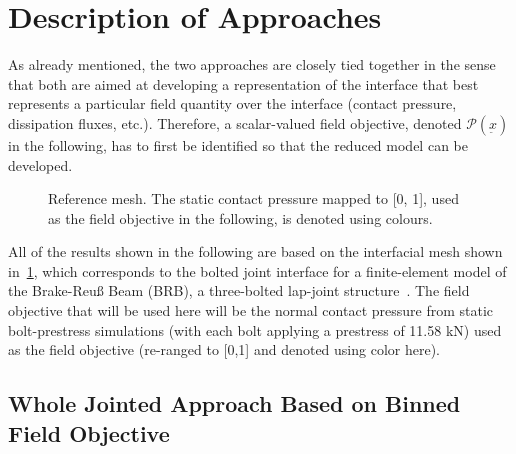 \documentclass[10pt,print]{article}
\newcommand{\utilde}[1]{\underset{\widetilde{}}{#1}}
\begin{document}
\section{Description of Approaches}
\label{sec:descr-appr}

As already mentioned, the two approaches are closely tied together in
the sense that both are aimed at developing a representation of the
interface that best represents a particular field quantity over the
interface (contact pressure, dissipation fluxes, etc.). Therefore, a
scalar-valued field objective, denoted $\mathcal{P}(\utilde{x})$
  in the following, has to first be identified so that the reduced
  model can be developed.

\begin{figure}[!h]
  \centering
  \caption{Reference mesh. The static contact pressure mapped to [0,
    1], used as the field objective in the following, is denoted using
    colours.}
  \label{fig:iraref}
\end{figure}

All of the results shown in the following are based on the
  interfacial mesh shown in~\cref{fig:iraref}, which corresponds to
  the bolted joint interface for a finite-element model of the
  Brake-Reu{\ss} Beam (BRB), a three-bolted lap-joint
  structure~\cite{brake2017mechanics}. The field objective that will
  be used here will be the normal contact pressure from static
  bolt-prestress simulations (with each bolt applying a prestress of
  11.58 kN) used as the field objective (re-ranged to [0,1] and
  denoted using color here).

\subsection{Whole Jointed Approach Based on Binned Field Objective}
\label{sec:whole-joint-appr}
\end{document}

